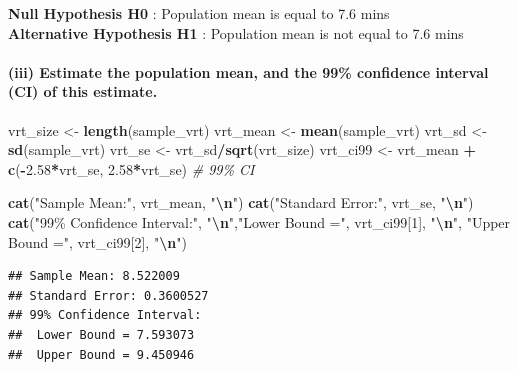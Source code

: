 \documentclass[
]{article}
\newenvironment{Shaded}{\begin{snugshade}}{\end{snugshade}}
\newcommand{\CommentTok}[1]{\textcolor[rgb]{0.56,0.35,0.01}{\textit{#1}}}
\newcommand{\DecValTok}[1]{\textcolor[rgb]{0.00,0.00,0.81}{#1}}
\newcommand{\FloatTok}[1]{\textcolor[rgb]{0.00,0.00,0.81}{#1}}
\newcommand{\FunctionTok}[1]{\textcolor[rgb]{0.13,0.29,0.53}{\textbf{#1}}}
\newcommand{\NormalTok}[1]{#1}
\newcommand{\OtherTok}[1]{\textcolor[rgb]{0.56,0.35,0.01}{#1}}
\newcommand{\SpecialCharTok}[1]{\textcolor[rgb]{0.81,0.36,0.00}{\textbf{#1}}}
\newcommand{\StringTok}[1]{\textcolor[rgb]{0.31,0.60,0.02}{#1}}
\begin{document}
\textbf{Null Hypothesis H0} : Population mean is equal to 7.6 mins\\
\textbf{Alternative Hypothesis H1} : Population mean is not equal to 7.6
mins

\hypertarget{iii-estimate-the-population-mean-and-the-99-confidence-interval-ci-of-this-estimate.}{%
\paragraph{(iii) Estimate the population mean, and the 99\% confidence
interval (CI) of this
estimate.}\label{iii-estimate-the-population-mean-and-the-99-confidence-interval-ci-of-this-estimate.}}

\begin{Shaded}
\begin{Highlighting}[]
\NormalTok{vrt\_size }\OtherTok{\textless{}{-}} \FunctionTok{length}\NormalTok{(sample\_vrt)}
\NormalTok{vrt\_mean }\OtherTok{\textless{}{-}} \FunctionTok{mean}\NormalTok{(sample\_vrt)}
\NormalTok{vrt\_sd }\OtherTok{\textless{}{-}} \FunctionTok{sd}\NormalTok{(sample\_vrt)}
\NormalTok{vrt\_se }\OtherTok{\textless{}{-}}\NormalTok{ vrt\_sd}\SpecialCharTok{/}\FunctionTok{sqrt}\NormalTok{(vrt\_size)}
\NormalTok{vrt\_ci99 }\OtherTok{\textless{}{-}}\NormalTok{ vrt\_mean }\SpecialCharTok{+} \FunctionTok{c}\NormalTok{(}\SpecialCharTok{{-}}\FloatTok{2.58}\SpecialCharTok{*}\NormalTok{vrt\_se, }\FloatTok{2.58}\SpecialCharTok{*}\NormalTok{vrt\_se) }\CommentTok{\# 99\% CI}

\FunctionTok{cat}\NormalTok{(}\StringTok{"Sample Mean:"}\NormalTok{, vrt\_mean, }\StringTok{"}\SpecialCharTok{\textbackslash{}n}\StringTok{"}\NormalTok{)}
\FunctionTok{cat}\NormalTok{(}\StringTok{"Standard Error:"}\NormalTok{, vrt\_se, }\StringTok{"}\SpecialCharTok{\textbackslash{}n}\StringTok{"}\NormalTok{)}
\FunctionTok{cat}\NormalTok{(}\StringTok{"99\% Confidence Interval:"}\NormalTok{, }
    \StringTok{"}\SpecialCharTok{\textbackslash{}n}\StringTok{"}\NormalTok{,}\StringTok{"Lower Bound ="}\NormalTok{, vrt\_ci99[}\DecValTok{1}\NormalTok{], }\StringTok{"}\SpecialCharTok{\textbackslash{}n}\StringTok{"}\NormalTok{,}
    \StringTok{"Upper Bound ="}\NormalTok{, vrt\_ci99[}\DecValTok{2}\NormalTok{], }\StringTok{"}\SpecialCharTok{\textbackslash{}n}\StringTok{"}\NormalTok{)}
\end{Highlighting}
\end{Shaded}

\begin{verbatim}
## Sample Mean: 8.522009 
## Standard Error: 0.3600527 
## 99% Confidence Interval: 
##  Lower Bound = 7.593073 
##  Upper Bound = 9.450946
\end{verbatim}
\end{document}
